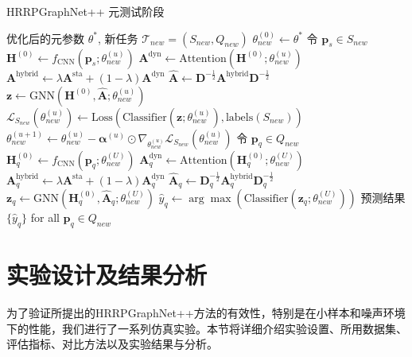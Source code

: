\begin{algorithm}[h!]
\caption{HRRPGraphNet++ 元测试阶段}
\label{alg:meta_testing}
\begin{algorithmic}[1]
\Require 优化后的元参数 $\theta^*$, 新任务 $\mathcal{T}_{new} = (S_{new}, Q_{new})$
\State $\theta_{new}^{(0)} \leftarrow \theta^*$ 
 
    \State 令 $\mathbf{p}_s \in S_{new}$
    \State $\mathbf{H}^{(0)} \leftarrow f_{\text{CNN}}(\mathbf{p}_s; \theta_{new}^{(u)})$
    \State $\mathbf{A}^{\text{dyn}} \leftarrow \text{Attention}(\mathbf{H}^{(0)}; \theta_{new}^{(u)})$
    \State $\mathbf{A}^{\text{hybrid}} \leftarrow \lambda \mathbf{A}^{\text{sta}} + (1-\lambda) \mathbf{A}^{\text{dyn}}$
    \State $\hat{\mathbf{A}} \leftarrow \mathbf{D}^{-\frac{1}{2}} \mathbf{A}^{\text{hybrid}} \mathbf{D}^{-\frac{1}{2}}$
    \State $\mathbf{z} \leftarrow \text{GNN}(\mathbf{H}^{(0)}, \hat{\mathbf{A}}; \theta_{new}^{(u)})$
    \State $\mathcal{L}_{S_{new}}(\theta_{new}^{(u)}) \leftarrow \text{Loss}( \text{Classifier}(\mathbf{z}; \theta_{new}^{(u)}), \text{labels}(S_{new}) )$
    \State $\theta_{new}^{(u+1)} \leftarrow \theta_{new}^{(u)} - \boldsymbol{\alpha}^{(u)} \odot \nabla_{\theta_{new}^{(u)}} \mathcal{L}_{S_{new}}(\theta_{new}^{(u)})$ 
\EndFor
\State {}
\State 令 $\mathbf{p}_q \in Q_{new}$
\State $\mathbf{H}_q^{(0)} \leftarrow f_{\text{CNN}}(\mathbf{p}_q; \theta_{new}^{(U)})$
\State $\mathbf{A}_q^{\text{dyn}} \leftarrow \text{Attention}(\mathbf{H}_q^{(0)}; \theta_{new}^{(U)})$
\State $\mathbf{A}_q^{\text{hybrid}} \leftarrow \lambda \mathbf{A}^{\text{sta}} + (1-\lambda) \mathbf{A}_q^{\text{dyn}}$
\State $\hat{\mathbf{A}}_q \leftarrow \mathbf{D}_q^{-\frac{1}{2}} \mathbf{A}_q^{\text{hybrid}} \mathbf{D}_q^{-\frac{1}{2}}$
\State $\mathbf{z}_q \leftarrow \text{GNN}(\mathbf{H}_q^{(0)}, \hat{\mathbf{A}}_q; \theta_{new}^{(U)})$
\State $\hat{y}_q \leftarrow \arg\max (\text{Classifier}(\mathbf{z}_q; \theta_{new}^{(U)}))$
\State \Return 预测结果 $\{\hat{y}_q\}$ for all $\mathbf{p}_q \in Q_{new}$
\end{algorithmic}
\end{algorithm}

\section{实验设计及结果分析}
\label{sec:experiments}

为了验证所提出的HRRPGraphNet++方法的有效性，特别是在小样本和噪声环境下的性能，我们进行了一系列仿真实验。本节将详细介绍实验设置、所用数据集、评估指标、对比方法以及实验结果与分析。

